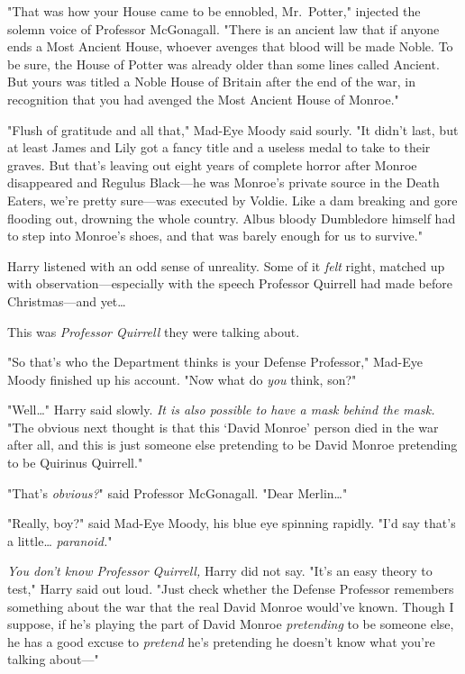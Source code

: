 "That was how your House came to be ennobled, Mr.~Potter," injected the solemn
voice of Professor McGonagall. "There is an ancient law that if anyone ends a
Most Ancient House, whoever avenges that blood will be made Noble. To be sure,
the House of Potter was already older than some lines called Ancient. But yours
was titled a Noble House of Britain after the end of the war, in recognition
that you had avenged the Most Ancient House of Monroe."

"Flush of gratitude and all that," Mad-Eye Moody said sourly. "It didn't last,
but at least James and Lily got a fancy title and a useless medal to take to
their graves. But that's leaving out eight years of complete horror after
Monroe disappeared and Regulus Black---he was Monroe's private source in the
Death Eaters, we're pretty sure---was executed by Voldie. Like a dam breaking
and gore flooding out, drowning the whole country. Albus bloody Dumbledore
himself had to step into Monroe's shoes, and that was barely enough for us to
survive."

Harry listened with an odd sense of unreality. Some of it \emph{felt} right,
matched up with observation---especially with the speech Professor Quirrell had
made before Christmas---and yet{\ldots}

This was \emph{Professor Quirrell} they were talking about.

"So that's who the Department thinks is your Defense Professor," Mad-Eye Moody
finished up his account. "Now what do \emph{you} think, son?"

"Well{\ldots}" Harry said slowly. \emph{It is also possible to have a mask
behind the mask.} "The obvious next thought is that this `David Monroe' person
died in the war after all, and this is just someone else pretending to be David
Monroe pretending to be Quirinus Quirrell."

"That's \emph{obvious?}" said Professor McGonagall. "Dear Merlin{\ldots}"

"Really, boy?" said Mad-Eye Moody, his blue eye spinning rapidly. "I'd say
that's a little{\ldots} \emph{paranoid.}"

\emph{You don't know Professor Quirrell,} Harry did not say. "It's an easy
theory to test," Harry said out loud. "Just check whether the Defense Professor
remembers something about the war that the real David Monroe would've known.
Though I suppose, if he's playing the part of David Monroe \emph{pretending} to
be someone else, he has a good excuse to \emph{pretend} he's pretending he
doesn't know what you're talking about---"

